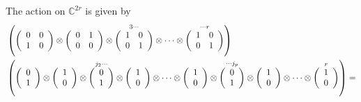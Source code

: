 \documentclass[aps,preprint]{revtex4}%
\begin{document}
The action on $\mathbb{C}^{2r}$ is given by \qquad%
\begin{align}
&  \left(  \left(
\begin{array}
[c]{cc}%
0 & 0\\
1 & 0
\end{array}
\right)  \otimes\left(
\begin{array}
[c]{cc}%
0 & 1\\
0 & 0
\end{array}
\right)  \otimes\overset{3\cdots}{\left(
\begin{array}
[c]{cc}%
1 & 0\\
0 & 1
\end{array}
\right)  }\otimes\cdots\otimes\overset{\cdots r}{\left(
\begin{array}
[c]{cc}%
1 & 0\\
0 & 1
\end{array}
\right)  }\right) \nonumber\\
&  \left(  \left(
\begin{array}
[c]{c}%
0\\
1
\end{array}
\right)  \otimes\left(
\begin{array}
[c]{c}%
1\\
0
\end{array}
\right)  \otimes\overset{j_{2}\cdots}{\left(
\begin{array}
[c]{c}%
0\\
1
\end{array}
\right)  }\otimes\left(
\begin{array}
[c]{c}%
1\\
0
\end{array}
\right)  \otimes\cdots\otimes\left(
\begin{array}
[c]{c}%
1\\
0
\end{array}
\right)  \otimes\overset{\cdots j_{p}}{\left(
\begin{array}
[c]{c}%
0\\
1
\end{array}
\right)  }\otimes\left(
\begin{array}
[c]{c}%
1\\
0
\end{array}
\right)  \otimes\cdots\otimes\overset{r}{\left(
\begin{array}
[c]{c}%
1\\
0
\end{array}
\right)  }\right)  =\nonumber\\

\end{align}
\end{document}
